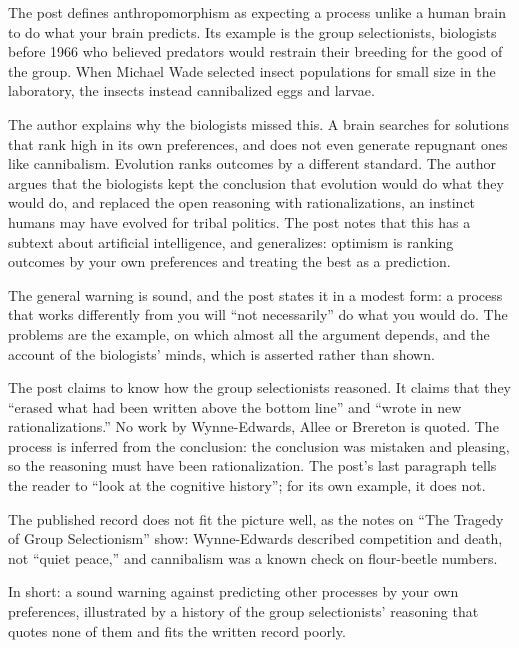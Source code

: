 \begin{afterword}
\summaryhead

The post defines anthropomorphism as expecting a process unlike a human brain to do what your brain predicts. Its example is the group selectionists, biologists before 1966 who believed predators would restrain their breeding for the good of the group. When Michael Wade selected insect populations for small size in the laboratory, the insects instead cannibalized eggs and larvae.

The author explains why the biologists missed this. A brain searches for solutions that rank high in its own preferences, and does not even generate repugnant ones like cannibalism. Evolution ranks outcomes by a different standard. The author argues that the biologists kept the conclusion that evolution would do what they would do, and replaced the open reasoning with rationalizations, an instinct humans may have evolved for tribal politics. The post notes that this has a subtext about artificial intelligence, and generalizes: optimism is ranking outcomes by your own preferences and treating the best as a prediction.

\responsehead

The general warning is sound, and the post states it in a modest form: a process that works differently from you will ``not necessarily'' do what you would do. The problems are the example, on which almost all the argument depends, and the account of the biologists' minds, which is asserted rather than shown.

The post claims to know how the group selectionists reasoned. It claims that they ``erased what had been written above the bottom line'' and ``wrote in new rationalizations.'' No work by Wynne-Edwards, Allee or Brereton is quoted. The process is inferred from the conclusion: the conclusion was mistaken and pleasing, so the reasoning must have been rationalization. The post's last paragraph tells the reader to ``look at the cognitive history''; for its own example, it does not.

The published record does not fit the picture well, as the notes on ``The Tragedy of Group Selectionism'' show: Wynne-Edwards described competition and death, not ``quiet peace,'' and cannibalism was a known check on flour-beetle numbers.

In short: a sound warning against predicting other processes by your own preferences, illustrated by a history of the group selectionists' reasoning that quotes none of them and fits the written record poorly.
\end{afterword}
